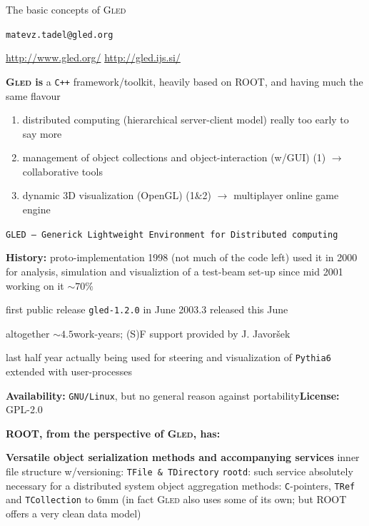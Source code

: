 \documentclass[12pt]{article}
\def\nl{\newline}
\def\hs6{\hbox to 6mm{}}
\def\qq{\quad\quad}
\def\smalltt#1{{\large\texttt{#1}}}
\def\gled{\textsc{Gled}\xspace}
\def\root{\textsc{ROOT}\xspace}
\def\cxx{\smalltt{C++}\xspace}
\begin{document}
\sffamily\Large

\thispagestyle{empty}

\centerline{\Huge The basic concepts of \gled}
\bigskip
\centerline{\texttt{matevz.tadel@gled.org}}
\medskip
\centerline{\color{dred}\url{http://www.gled.org/} \qq 
  \color{dgreen}\url{http://gled.ijs.si/}}

\vskip 8mm

\textbf{\gled is} a \cxx framework/toolkit, heavily based on
\root, and having much the same flavour

\begin{enumerate}
\item distributed computing (hierarchical server-client model)%
  \hfill {\large really too early to say more}

\item management of object collections and object-interaction (w/GUI)%
  \hfill {\large (1) $\to$ collaborative tools}

\item dynamic 3D visualization (OpenGL)%
  \hfill {\large (1\&2) $\to$ multiplayer online game engine}
\end{enumerate}

\medskip
\centerline{{\color{dblue}\texttt{GLED -- Generick Lightweight Environment for Distributed computing}}}
\bigskip

\textbf{History:} proto-implementation 1998 (not much of the code left)\nl
used it in 2000 for analysis, simulation and visualiztion of a
test-beam set-up\nl
since mid 2001 working on it $\sim 70\%$

first public release \texttt{gled-1.2.0} in June 2003\nl
1.2.3 released this June

altogether $\sim4.5$\;work-years; (S)F support provided by J. Javor\v{s}ek

last half year actually being used for steering and visualization of
\texttt{Pythia6} extended with user-processes

\bigskip

\textbf{Availability:} \texttt{GNU/Linux}, but no general reason
against portability\hfill \textbf{License:} GPL-2.0

\newpage
\setcounter{page}{1}

\textbf{\LARGE \root, from the perspective of \gled, has:} 

\bigskip
\textbf{Versatile object serialization methods and
  accompanying services}\nl
%
inner file structure w/versioning: \texttt{TFile \& TDirectory}\nl
%
\texttt{rootd}: such service absolutely necessary for a distributed
system\nl
%
object aggregation methods: \texttt{C}-pointers, \texttt{TRef} and
\texttt{TCollection}\nl
%
\hs6 (in fact \gled also uses some of its own; but \root offers a very
clean data model)
\end{document}
